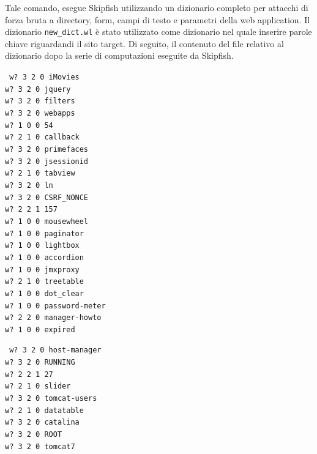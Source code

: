 \documentclass{article}
\begin{document}
\begin{itemize}
Tale comando, esegue Skipfish utilizzando un dizionario completo per attacchi di forza bruta a directory, form, campi di testo e parametri della web application.
Il dizionario {\tt new\_dict.wl} è stato utilizzato come dizionario nel quale inserire parole chiave riguardandi il sito target. Di seguito, il contenuto del file relativo al dizionario dopo la serie di computazioni eseguite da Skipfish.
\begin{small}
\begin{minipage}{0.47\textwidth}
\tt
w? 3 2 0 iMovies\\
w? 3 2 0 jquery\\
w? 3 2 0 filters\\
w? 3 2 0 webapps\\
w? 1 0 0 54\\
w? 2 1 0 callback\\
w? 3 2 0 primefaces\\
w? 3 2 0 jsessionid\\
w? 2 1 0 tabview\\
w? 3 2 0 ln\\
w? 3 2 0 CSRF\_NONCE\\
w? 2 2 1 157\\
w? 1 0 0 mousewheel\\
w? 1 0 0 paginator\\
w? 1 0 0 lightbox\\
w? 1 0 0 accordion\\
w? 1 0 0 jmxproxy\\
w? 2 1 0 treetable\\
w? 1 0 0 dot\_clear\\
w? 1 0 0 password-meter\\
w? 2 2 0 manager-howto\\
w? 1 0 0 expired\\
\end{minipage}
\begin{minipage}{0.47\textwidth}
\tt
w? 3 2 0 host-manager\\
w? 3 2 0 RUNNING\\
w? 2 2 1 27\\
w? 2 1 0 slider\\
w? 3 2 0 tomcat-users\\
w? 2 1 0 datatable\\
w? 3 2 0 catalina\\
w? 3 2 0 ROOT\\
w? 3 2 0 tomcat7\\

\end{minipage}
\end{small}
\end{itemize}
\end{document}
